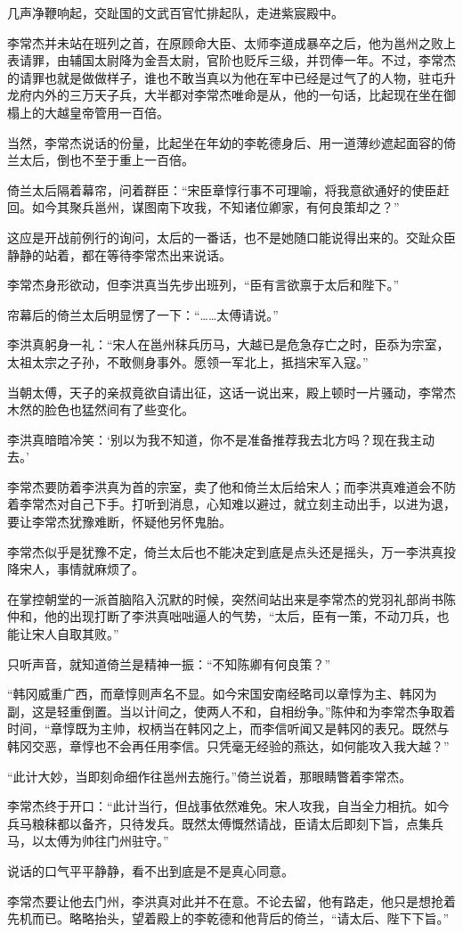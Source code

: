 几声净鞭响起，交趾国的文武百官忙排起队，走进紫宸殿中。

李常杰并未站在班列之首，在原顾命大臣、太师李道成暴卒之后，他为邕州之败上表请罪，由辅国太尉降为金吾太尉，官阶也贬斥三级，并罚俸一年。不过，李常杰的请罪也就是做做样子，谁也不敢当真以为他在军中已经是过气了的人物，驻屯升龙府内外的三万天子兵，大半都对李常杰唯命是从，他的一句话，比起现在坐在御榻上的大越皇帝管用一百倍。

当然，李常杰说话的份量，比起坐在年幼的李乾德身后、用一道薄纱遮起面容的倚兰太后，倒也不至于重上一百倍。

倚兰太后隔着幕帘，问着群臣：“宋臣章惇行事不可理喻，将我意欲通好的使臣赶回。如今其聚兵邕州，谋图南下攻我，不知诸位卿家，有何良策却之？”

这应是开战前例行的询问，太后的一番话，也不是她随口能说得出来的。交趾众臣静静的站着，都在等待李常杰出来说话。

李常杰身形欲动，但李洪真当先步出班列，“臣有言欲禀于太后和陛下。”

帘幕后的倚兰太后明显愣了一下：“……太傅请说。”

李洪真躬身一礼：“宋人在邕州秣兵历马，大越已是危急存亡之时，臣忝为宗室，太祖太宗之子孙，不敢侧身事外。愿领一军北上，抵挡宋军入寇。”

当朝太傅，天子的亲叔竟欲自请出征，这话一说出来，殿上顿时一片骚动，李常杰木然的脸色也猛然间有了些变化。

李洪真暗暗冷笑：‘别以为我不知道，你不是准备推荐我去北方吗？现在我主动去。’

李常杰要防着李洪真为首的宗室，卖了他和倚兰太后给宋人；而李洪真难道会不防着李常杰对自己下手。打听到消息，心知难以避过，就立刻主动出手，以进为退，要让李常杰犹豫难断，怀疑他另怀鬼胎。

李常杰似乎是犹豫不定，倚兰太后也不能决定到底是点头还是摇头，万一李洪真投降宋人，事情就麻烦了。

在掌控朝堂的一派首脑陷入沉默的时候，突然间站出来是李常杰的党羽礼部尚书陈仲和，他的出现打断了李洪真咄咄逼人的气势，“太后，臣有一策，不动刀兵，也能让宋人自取其败。”

只听声音，就知道倚兰是精神一振：“不知陈卿有何良策？”

“韩冈威重广西，而章惇则声名不显。如今宋国安南经略司以章惇为主、韩冈为副，这是轻重倒置。当以计间之，使两人不和，自相纷争。”陈仲和为李常杰争取着时间，“章惇既为主帅，权柄当在韩冈之上，而李信听闻又是韩冈的表兄。既然与韩冈交恶，章惇也不会再任用李信。只凭毫无经验的燕达，如何能攻入我大越？”

“此计大妙，当即刻命细作往邕州去施行。”倚兰说着，那眼睛瞥着李常杰。

李常杰终于开口：“此计当行，但战事依然难免。宋人攻我，自当全力相抗。如今兵马粮秣都以备齐，只待发兵。既然太傅慨然请战，臣请太后即刻下旨，点集兵马，以太傅为帅往门州驻守。”

说话的口气平平静静，看不出到底是不是真心同意。

李常杰要让他去门州，李洪真对此并不在意。不论去留，他有路走，他只是想抢着先机而已。略略抬头，望着殿上的李乾德和他背后的倚兰，“请太后、陛下下旨。”

